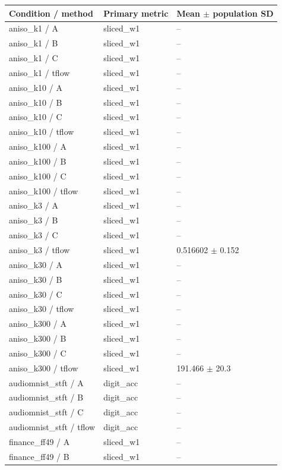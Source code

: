 \begin{tabular}{lll}
\toprule
Condition / method & Primary metric & Mean $\pm$ population SD \\
\midrule
aniso\_k1 / A & sliced\_w1 & -- \\
aniso\_k1 / B & sliced\_w1 & -- \\
aniso\_k1 / C & sliced\_w1 & -- \\
aniso\_k1 / tflow & sliced\_w1 & -- \\
aniso\_k10 / A & sliced\_w1 & -- \\
aniso\_k10 / B & sliced\_w1 & -- \\
aniso\_k10 / C & sliced\_w1 & -- \\
aniso\_k10 / tflow & sliced\_w1 & -- \\
aniso\_k100 / A & sliced\_w1 & -- \\
aniso\_k100 / B & sliced\_w1 & -- \\
aniso\_k100 / C & sliced\_w1 & -- \\
aniso\_k100 / tflow & sliced\_w1 & -- \\
aniso\_k3 / A & sliced\_w1 & -- \\
aniso\_k3 / B & sliced\_w1 & -- \\
aniso\_k3 / C & sliced\_w1 & -- \\
aniso\_k3 / tflow & sliced\_w1 & 0.516602 $\pm$ 0.152 \\
aniso\_k30 / A & sliced\_w1 & -- \\
aniso\_k30 / B & sliced\_w1 & -- \\
aniso\_k30 / C & sliced\_w1 & -- \\
aniso\_k30 / tflow & sliced\_w1 & -- \\
aniso\_k300 / A & sliced\_w1 & -- \\
aniso\_k300 / B & sliced\_w1 & -- \\
aniso\_k300 / C & sliced\_w1 & -- \\
aniso\_k300 / tflow & sliced\_w1 & 191.466 $\pm$ 20.3 \\
audiomnist\_stft / A & digit\_acc & -- \\
audiomnist\_stft / B & digit\_acc & -- \\
audiomnist\_stft / C & digit\_acc & -- \\
audiomnist\_stft / tflow & digit\_acc & -- \\
finance\_ff49 / A & sliced\_w1 & -- \\
finance\_ff49 / B & sliced\_w1 & -- \\

\end{tabular}
